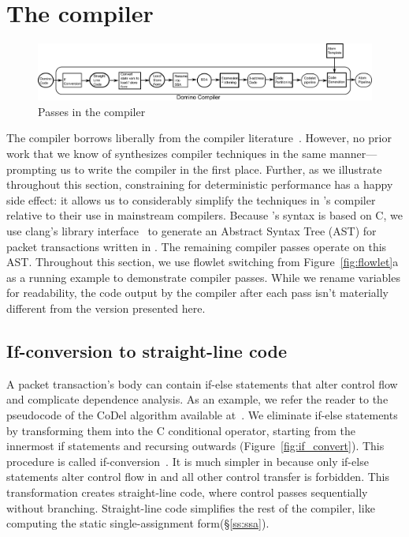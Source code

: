 \section{The \pktlanguage compiler}
\label{s:compiler}

\begin{figure}[!t]
  \includegraphics[width=\textwidth]{compiler.pdf}
  \caption{Passes in the \pktlanguage compiler}
\end{figure}

The \pktlanguage compiler borrows liberally from the compiler
literature~\cite{muchnik}. However, no prior work that we know of synthesizes
compiler techniques in the same manner---prompting us to write the \pktlanguage
compiler in the first place. Further, as we illustrate throughout this section,
constraining \pktlanguage for deterministic performance has a happy side
effect: it allows us to considerably simplify the techniques in \pktlanguage's
compiler relative to their use in mainstream compilers. Because \pktlanguage's
syntax is based on C, we use clang's library interface~\cite{libclang} to
generate an Abstract Syntax Tree (AST) for packet transactions written in
\pktlanguage. The remaining compiler passes operate on this AST. Throughout
this section, we use flowlet switching from Figure~\ref{fig:flowlet}a as a
running example to demonstrate compiler passes. While we rename variables for
readability, the code output by the \pktlanguage compiler after each pass isn't
materially different from the version presented here.

\subsection{If-conversion to straight-line code}
A packet transaction's body can contain if-else statements that alter control
flow and complicate dependence analysis. As an example, we refer the reader to
the pseudocode of the CoDel algorithm available at~\cite{codel_code}. We
eliminate if-else statements by transforming them into the C conditional
operator, starting from the innermost if statements and recursing outwards
(Figure~\ref{fig:if_convert}). This procedure is called
if-conversion~\cite{if_conversion}. It is much simpler in \pktlanguage because
only if-else statements alter control flow in \pktlanguage and all other control
transfer is forbidden.  This transformation creates
straight-line code, where control passes sequentially without branching.
Straight-line code simplifies the rest of the compiler, like computing the
static single-assignment form(\S\ref{ss:ssa}).

